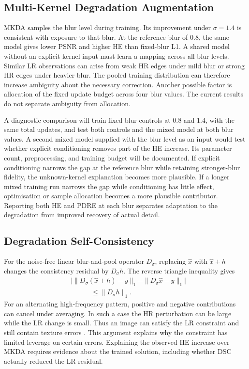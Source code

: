 \documentclass[journal]{IEEEtran}
\begin{document}
\subsection{Multi-Kernel Degradation Augmentation}
MKDA samples the blur level during training. Its improvement under $\sigma=1.4$ is consistent with exposure to that blur. At the reference blur of $0.8$, the same model gives lower PSNR and higher HE than fixed-blur L1. A shared model without an explicit kernel input must learn a mapping across all blur levels. Similar LR observations can arise from weak HR edges under mild blur or strong HR edges under heavier blur. The pooled training distribution can therefore increase ambiguity about the necessary correction. Another possible factor is allocation of the fixed update budget across four blur values. The current results do not separate ambiguity from allocation.

A diagnostic comparison will train fixed-blur controls at $0.8$ and $1.4$, with the same total updates, and test both controls and the mixed model at both blur values. A second mixed model supplied with the blur level as an input would test whether explicit conditioning removes part of the HE increase. Its parameter count, preprocessing, and training budget will be documented. If explicit conditioning narrows the gap at the reference blur while retaining stronger-blur fidelity, the unknown-kernel explanation becomes more plausible. If a longer mixed training run narrows the gap while conditioning has little effect, optimisation or sample allocation becomes a more plausible contributor. Reporting both HE and PDRE at each blur separates adaptation to the degradation from improved recovery of actual detail.

\subsection{Degradation Self-Consistency}
For the noise-free linear blur-and-pool operator $D_\sigma$, replacing $\hat{x}$ with $\hat{x}+h$ changes the consistency residual by $D_\sigma h$. The reverse triangle inequality gives
\begin{equation}
\begin{split}
&\big|\|D_\sigma(\hat{x}+h)-y\|_1
           -\|D_\sigma\hat{x}-y\|_1\big|\\
&\hspace{3em}\leq \|D_\sigma h\|_1.
\end{split}
\label{eq:dsc-bound}
\end{equation}
For an alternating high-frequency pattern, positive and negative contributions can cancel under averaging. In such a case the HR perturbation can be large while the LR change is small. Thus an image can satisfy the LR constraint and still contain texture errors \cite{bhadra2021hallucinations}. This argument explains why the constraint has limited leverage on certain errors. Explaining the observed HE increase over MKDA requires evidence about the trained solution, including whether DSC actually reduced the LR residual.
\end{document}
